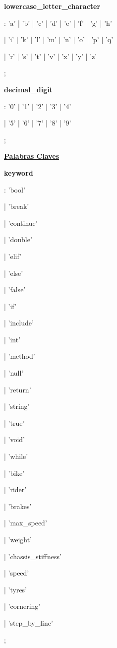		\textbf{lowercase\_letter\_character}\par
		: 'a' | 'b' | 'c' | 'd' | 'e' | 'f' | 'g' | 'h'\par 
		| 'i' | 'k' | 'l' | 'm' | 'n' | 'o' | 'p' | 'q'\par
		| 'r' | 's' | 't' | 'v' | 'x' | 'y' | 'z'\par
		;\par
		
		\textbf{decimal\_digit}\par
		: '0' | '1' | '2' | '3' | '4'\par 
		| '5' | '6' | '7' | '8' | '9'\par
		;\par
		
		\underline{\textbf{Palabras Claves}}\par
		\textbf{keyword}\par             
		: 'bool'\par
		| 'break'\par
		| 'continue'\par 
		| 'double'\par
		| 'elif'\par
		| 'else'\par
		| 'false'\par
		| 'if'\par
		| 'include'\par
		| 'int'\par
		| 'method'\par
		| 'null'\par
		| 'return'\par
		| 'string'\par
		| 'true'\par
		| 'void'\par
		| 'while'\par
		
		| 'bike'\par
		| 'rider'\par
		
		| 'brakes'\par
		| 'max\_speed'\par
		| 'weight'\par
		| 'chassis\_stiffness'\par
		| 'speed'\par
		| 'tyres'\par
		| 'cornering'\par
		| 'step\_by\_line'\par		
		;\par
		
